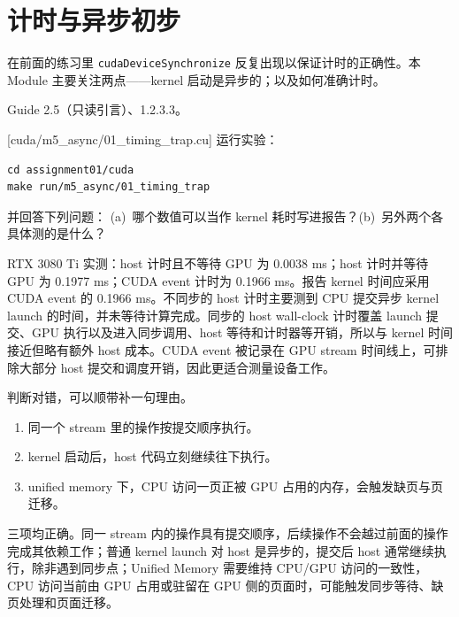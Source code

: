 \documentclass[11pt,a4paper,fontset=none]{ctexart}
\begin{document}
\section{计时与异步初步}

在前面的练习里 \texttt{cudaDeviceSynchronize} 反复出现以保证计时的正确性。本 Module 主要关注两点——kernel 启动是异步的；以及如何准确计时。

\begin{reading}
Guide 2.5（只读引言）、1.2.3.3。
\end{reading}

[cuda/m5\_async/01\_timing\_trap.cu]
运行实验：

\begin{lstlisting}
cd assignment01/cuda
make run/m5_async/01_timing_trap
\end{lstlisting}

并回答下列问题：
(a)~哪个数值可以当作 kernel 耗时写进报告？(b)~另外两个各具体测的是什么？

\begin{tcolorbox}[title={5.1 实验记录与作答}]
RTX 3080 Ti 实测：host 计时且不等待 GPU 为 0.0038 ms；host 计时并等待 GPU 为 0.1977 ms；CUDA event 计时为 0.1966 ms。报告 kernel 时间应采用 CUDA event 的 0.1966 ms。不同步的 host 计时主要测到 CPU 提交异步 kernel launch 的时间，并未等待计算完成。同步的 host wall-clock 计时覆盖 launch 提交、GPU 执行以及进入同步调用、host 等待和计时器等开销，所以与 kernel 时间接近但略有额外 host 成本。CUDA event 被记录在 GPU stream 时间线上，可排除大部分 host 提交和调度开销，因此更适合测量设备工作。
\end{tcolorbox}

判断对错，可以顺带补一句理由。
\begin{enumerate}[label=(\alph*)]
  \item 同一个 stream 里的操作按提交顺序执行。
  \item kernel 启动后，host 代码立刻继续往下执行。
  \item unified memory 下，CPU 访问一页正被 GPU 占用的内存，会触发缺页与页迁移。
\end{enumerate}

\begin{tcolorbox}[title={5.2 作答（讨论后整理）}]
三项均正确。同一 stream 内的操作具有提交顺序，后续操作不会越过前面的操作完成其依赖工作；普通 kernel launch 对 host 是异步的，提交后 host 通常继续执行，除非遇到同步点；Unified Memory 需要维持 CPU/GPU 访问的一致性，CPU 访问当前由 GPU 占用或驻留在 GPU 侧的页面时，可能触发同步等待、缺页处理和页面迁移。
\end{tcolorbox}
\end{document}
